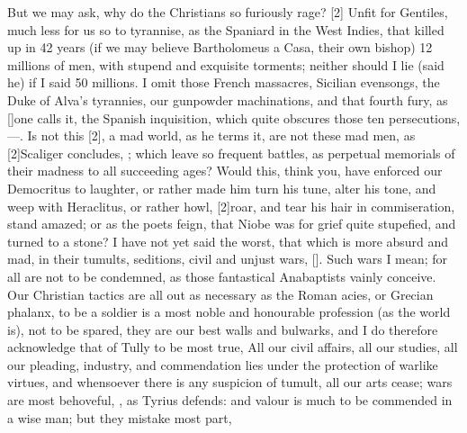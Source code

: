 {But we may ask, why do the Christians so furiously rage? [2\baselineskip] Unfit for Gentiles, much
less for us so to tyrannise, as the Spaniard in the West Indies, that
killed up in 42 years (if we may believe Bartholomeus a Casa,
their own bishop) 12 millions of men, with stupend and exquisite
torments; neither should I lie (said he) if I said 50 millions. I omit
those French massacres, Sicilian evensongs, the Duke of Alva's
tyrannies, our gunpowder machinations, and that fourth fury, as
[\baselineskip]one calls it, the Spanish inquisition, which quite obscures those
ten persecutions, ---. Is not this
[2\baselineskip], a mad world, as he terms it,  are
not these mad men, as [2\baselineskip]Scaliger concludes, ; which leave so frequent battles, as perpetual memorials of
their madness to all succeeding ages? Would this, think you, have
enforced our Democritus to laughter, or rather made him turn his tune,
alter his tone, and weep with Heraclitus, or rather howl,
[2\baselineskip]roar, and tear his hair in commiseration, stand amazed; or as the
poets feign, that Niobe was for grief quite stupefied, and turned to a
stone? I have not yet said the worst, that which is more absurd and
mad, in their tumults, seditions, civil and unjust wars, [\baselineskip]. Such wars I mean; for
all are not to be condemned, as those fantastical Anabaptists vainly
conceive. Our Christian tactics are all out as necessary as the Roman
acies, or Grecian phalanx, to be a soldier is a most noble and
honourable profession (as the world is), not to be spared, they are our
best walls and bulwarks, and I do therefore acknowledge that of
Tully to be most true, All our civil affairs, all our studies, all
our pleading, industry, and commendation lies under the protection of
warlike virtues, and whensoever there is any suspicion of tumult, all
our arts cease; wars are most behoveful, , as Tyrius defends: and valour is much to
be commended in a wise man; but they mistake most part, }
